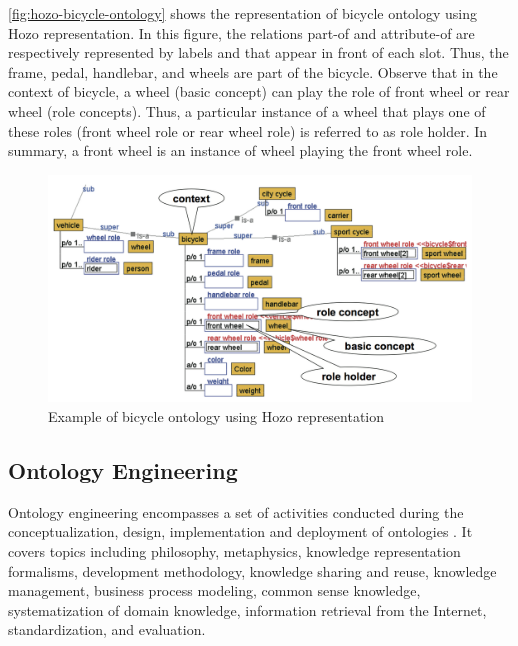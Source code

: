 \autoref{fig:hozo-bicycle-ontology} shows the representation of bicycle ontology using Hozo representation.
In this figure, the relations part-of and attribute-of are respectively represented by labels  and  that appear in front of each slot.
Thus, the frame, pedal, handlebar, and wheels are part of the bicycle.
Observe that in the context of bicycle, a wheel (basic concept) can play the role of front wheel or rear wheel (role concepts).
Thus, a particular instance of a wheel that plays one of these roles (front wheel role or rear wheel role) is referred to as role holder.
In summary, a front wheel is an instance of wheel playing the front wheel role.

\begin{figure}[htb]
 \caption{Example of bicycle ontology using Hozo representation}
 \label{fig:hozo-bicycle-ontology}
 \centering
 \includegraphics[width=1\textwidth]{images/chap-general-background/hozo-bicycle-ontology.png}
\end{figure}


\subsection{Ontology Engineering}
\label{subsec:ontology-engineering}

Ontology engineering encompasses a set of activities conducted during the conceptualization, design, implementation and deployment of ontologies \cite{Devedzic2002,Devedzic2006}.
It covers topics including philosophy, metaphysics, knowledge representation formalisms, development methodology, knowledge sharing and reuse, knowledge management, business process modeling, common sense knowledge, systematization of domain knowledge, information retrieval from the Internet, standardization, and evaluation.

